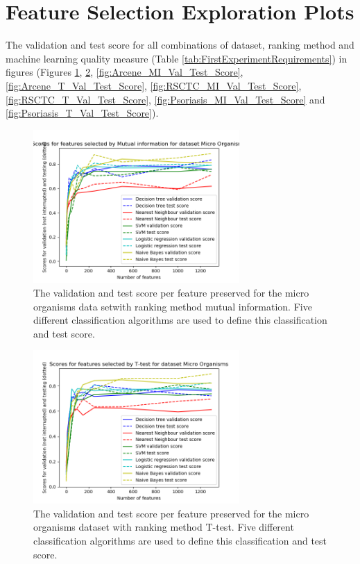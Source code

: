 \documentclass[10pt,a4paper]{article}
\begin{document}
	 
	
	
	\appendix
	
	\section{Feature Selection Exploration Plots}
	\label{app:FeatureSelectionExplorationPlots}
	
	The validation and test score for all combinations of dataset, ranking method and machine learning quality measure (Table \ref{tab:FirstExperimentRequirements}) in figures (Figures \ref{fig:MO_MI_Val_Test_Score}, \ref{fig:MO_T_Val_Test_Score}, \ref{fig:Arcene_MI_Val_Test_Score}, \ref{fig:Arcene_T_Val_Test_Score}, \ref{fig:RSCTC_MI_Val_Test_Score}, \ref{fig:RSCTC_T_Val_Test_Score}, \ref{fig:Psoriasis_MI_Val_Test_Score} and \ref{fig:Psoriasis_T_Val_Test_Score}). 
	
	\begin{figure}[H]
		\includegraphics[width=0.7\textwidth]{MO_MI_Val_Test_Score.png}
		\caption{The validation and test score per feature preserved for the micro organisms data setwith ranking method mutual information. Five different classification algorithms are used to define this classification and test score.}
		\label{fig:MO_MI_Val_Test_Score}
	\end{figure}
	
	\begin{figure}[H]
		\includegraphics[width=0.7\textwidth]{MO_T_Val_Test_Score.png}
		\caption{The validation and test score per feature preserved for the micro organisms dataset with ranking method T-test. Five different classification algorithms are used to define this classification and test score.}
		\label{fig:MO_T_Val_Test_Score}
	\end{figure}
\end{document}
